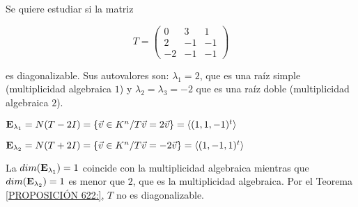 \begin{example}
Se quiere estudiar  si la matriz

$$T= \left(\begin{array}{ccc} 0 & 3 & 1  \\ 2  & -1 & -1
\\ -2  & -1 & -1
\end{array}
 \right)$$ 

\bigskip

\noindent
es diagonalizable. Sus autovalores son: $\lambda_1=2$, que es una  raíz simple (multiplicidad algebraica $1$) y  $\lambda_2= \lambda_3=-2$  que es una raíz doble (multiplicidad algebraica  $2$).
 
\bigskip 

\bigskip

$\bold E_{\lambda_1}  =N(T-2 I)=\{\vec{v} \in K^n /T\vec{v}=  2 \vec{v}\}= \langle ( 1,1,-1)^t \rangle$

\bigskip

$\bold E_{\lambda_2}  =N(T+2 I)=\{\vec{v} \in K^n /T\vec{v}=  -2 \vec{v}\}= \langle ( 1,-1,1)^t \rangle$

\bigskip

La $dim(\bold E_{\lambda_1})=1$ coincide con la multiplicidad algebraica mientras que $dim(\bold E_{\lambda_2})=1$   es menor que $2$,  que es la multiplicidad algebraica. Por el Teorema \ref{PROPOSICIÓN 622:}, $T$ no es diagonalizable.
\end{example}

\bigskip




